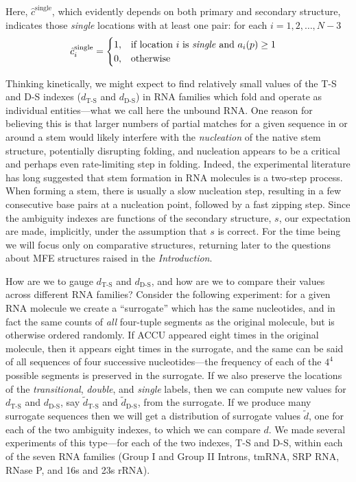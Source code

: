 \documentclass[10pt,letterpaper]{article}
\begin{document}
Here, $\hat{c}^{\text{single}}$, which evidently depends on both primary and secondary structure, indicates those {\em single} locations with at least one pair: for each $i=1,2,\ldots,N-3$
\begin{align}
	\hat{c}_i^{\text{single}} & =
	\begin{cases}
		1, & \text{if location $i$ is \textit{single} and $a_i(p)\geq 1$} \\
		0, & \text{otherwise}
	\end{cases}
\end{align}

Thinking kinetically, we might expect to find relatively small values of the T-S and D-S indexes
($d_\text{T-S}$ and $d_\text{D-S}$)
in RNA families which fold and operate as individual entities---what we call here the unbound RNA. One reason for believing this
is that larger numbers of partial matches for a given sequence in or around a stem would likely interfere with the {\em nucleation} of the native stem structure, potentially disrupting folding, and nucleation appears to be a critical and perhaps even rate-limiting step in folding. 
Indeed, the experimental literature  \cite{Porschke1974-hn, Porschke1974-nr, Porschke1977-xz, Mohan2009-gt} has long suggested that stem formation in RNA molecules is a two-step process. When forming a stem, there is usually a slow nucleation step, resulting in a few consecutive base pairs at a nucleation point, followed by a fast zipping step. 
Since the ambiguity indexes are functions of the secondary structure, $s$, 
our expectation are made, implicitly, under the assumption that $s$ is correct. For the time being we will focus only on comparative structures, returning later to the questions about MFE structures raised in the {\em Introduction}. 

How are
we to gauge $d_\text{T-S}$ and $d_\text{D-S}$, and how are we to compare their values across different RNA families? 
Consider the following experiment: for a given RNA molecule we create a ``surrogate'' which has the same nucleotides, and in fact the same counts of {\em all} four-tuple segments as the original molecule, but is otherwise ordered randomly. If ACCU appeared eight times in the original molecule, then it appears eight times in the surrogate, and the same can be said of all sequences of four successive nucleotides---the frequency of each of the $4^4$ possible segments is preserved in the surrogate.  If we also preserve the locations of the {\it transitional}, {\it double}, and {\it single} labels, then we can compute new values for $d_\text{T-S}$ and $d_\text{D-S}$,
say  $\tilde{d}_\text{T-S}$ and $\tilde{d}_\text{D-S}$, from the surrogate. If we produce many surrogate sequences then we will get a distribution of  
surrogate values $\tilde{d}$, one for each of the two ambiguity indexes, to which we can compare $d$. We made several experiments of this type---for each of the two indexes, T-S and D-S, within each of the seven RNA families (Group I and Group II Introns, tmRNA, SRP RNA, RNase P, and 16s and 23s rRNA).
\end{document}
